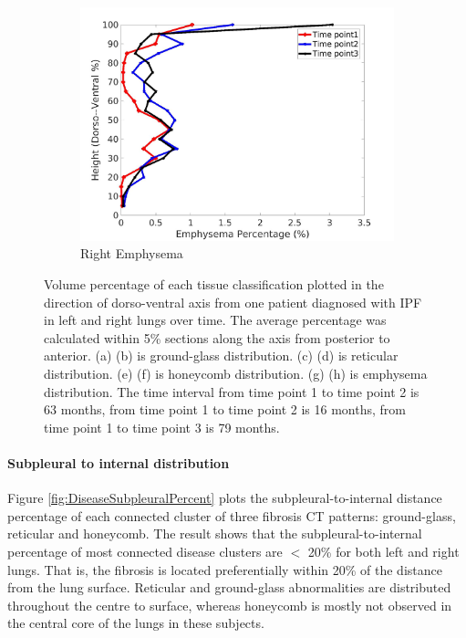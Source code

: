 \begin{figure}[H]
\begin{subfigure}{.42\linewidth}
  \includegraphics[width=\linewidth,trim={{.0\wd0} {.0\wd0} {.0\wd0} {.0\wd0}},clip]{QuantitativeAnalysis/Image/IPF21RightLungEmphysemaDiseaseDorsoToVentral.jpg}
  \caption{Right Emphysema}
  \label{fig:IPF21DiseaseDorsoToVentralMain-h}
\end{subfigure}
\caption{Volume percentage of each tissue classification plotted in the direction of dorso-ventral axis from one patient diagnosed with IPF in left and right lungs over time. The average percentage was calculated within 5\% sections along the axis from posterior to anterior. (a) (b) is ground-glass distribution. (c) (d) is reticular distribution. (e) (f) is honeycomb distribution. (g) (h) is emphysema distribution. The time interval from time point 1 to time point 2 is 63 months, from time point 1 to time point 2 is 16 months, from time point 1 to time point 3 is 79 months.}
\label{fig:IPF21DiseaseDorsoToVentralMain}
\end{figure}

\paragraph{Subpleural to internal distribution}
Figure \ref{fig:DiseaseSubpleuralPercent} plots the subpleural-to-internal distance percentage of each connected cluster of three fibrosis CT patterns: ground-glass, reticular and honeycomb. The result shows that the subpleural-to-internal percentage of most connected disease clusters are $<$ 20\% for both left and right lungs. That is, the fibrosis is located preferentially within 20\% of the distance from the lung surface. Reticular and ground-glass abnormalities are distributed throughout the centre to surface, whereas honeycomb is mostly not observed in the central core of the lungs in these subjects.

